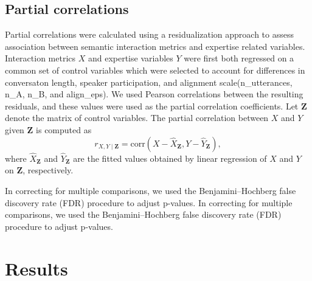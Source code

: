 \documentclass{article}
\theoremstyle{definition}
\numberwithin{table}{section}
\begin{document}
\subsection{Partial correlations}

Partial correlations were calculated using a residualization approach to assess association between semantic interaction metrics and expertise related variables. Interaction metrics $X$ and expertise variables $Y$ were first both regressed on a common set of control variables which were selected to account for differences in conversaton length, speaker participation, and alignment scale(n\_utterances, n\_A, n\_B, and align\_eps). We used Pearson correlations between the resulting residuals, and these values were used as the partial correlation coefficients. 
Let $\mathbf{Z}$ denote the matrix of control variables. The partial correlation between $X$ and $Y$ given $\mathbf{Z}$ is computed as
\[
r_{X,Y \mid \mathbf{Z}} = \mathrm{corr}\!\left(
X - \hat{X}_{\mathbf{Z}},
Y - \hat{Y}_{\mathbf{Z}}
\right),
\]
where $\hat{X}_{\mathbf{Z}}$ and $\hat{Y}_{\mathbf{Z}}$ are the fitted values obtained by linear regression of $X$ and $Y$ on $\mathbf{Z}$, respectively. 

In correcting for multiple comparisons, we used the Benjamini–Hochberg false discovery rate (FDR) procedure to adjust p-values. 
In correcting for multiple comparisons, we used the Benjamini–Hochberg false discovery rate (FDR) procedure to adjust p-values. 

\section{Results}
\end{document}
